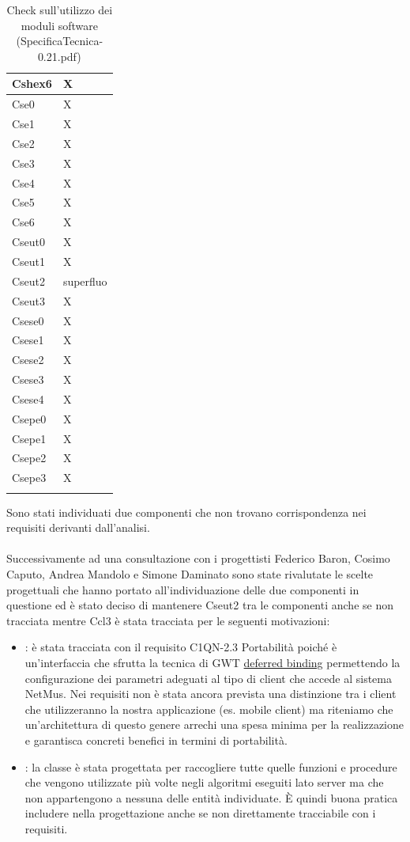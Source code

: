 \begin{footnotesize}
\begin{longtable}{|p{}|p{}|}
 Cshex6 &X  \\ \hline
 Cse0 &X  \\ \hline
 Cse1 &X  \\ \hline
 Cse2 &X  \\ \hline
 Cse3 &X  \\ \hline
 Cse4 &X  \\ \hline
 Cse5 &X  \\ \hline
 Cse6 &X  \\ \hline
 Cseut0 &X  \\ \hline
 Cseut1 &X  \\ \hline
 Cseut2 &superfluo  \\ \hline
 Cseut3 &X  \\ \hline
 Csese0 &X  \\ \hline
 Csese1 &X  \\ \hline
 Csese2 &X  \\ \hline
 Csese3 &X  \\ \hline
 Csese4 &X  \\ \hline
 Csepe0 &X  \\ \hline
 Csepe1 &X  \\ \hline
 Csepe2 &X  \\ \hline
 Csepe3 &X  \\ \hline

\caption{Check sull'utilizzo dei moduli software (SpecificaTecnica-0.21.pdf)}
\end{longtable}
\end{footnotesize}

Sono stati individuati due componenti che non trovano corrispondenza nei
requisiti derivanti dall'analisi. \\\\ 
Successivamente ad una consultazione con i progettisti Federico Baron, Cosimo
Caputo, Andrea Mandolo e Simone Daminato sono state rivalutate le scelte
progettuali che hanno portato all'individuazione delle due componenti in
questione ed \`e stato deciso di mantenere Cseut2 tra le componenti anche se non
tracciata mentre Ccl3 \`e stata tracciata per le seguenti motivazioni:
\begin{itemize}
  \item{: \`e stata tracciata con il requisito
  C1QN-2.3 Portabilit\`a poich\'e  \`e un'interfaccia che
  sfrutta la tecnica di GWT \underline{deferred binding} permettendo la
  configurazione dei parametri adeguati al tipo di client che accede al sistema
  NetMus. Nei requisiti non \`e stata ancora prevista una distinzione tra i
  client che utilizzeranno la nostra applicazione (es. mobile client) ma
  riteniamo che un'architettura di questo genere arrechi una spesa minima per la
  realizzazione e garantisca concreti benefici in termini di portabilit\`a.}
  \item{: la classe  \`e stata progettata per raccogliere
  tutte quelle funzioni e procedure che vengono utilizzate pi\`u volte negli
  algoritmi eseguiti lato server ma che non appartengono a nessuna delle entit\`a
  individuate. \`E quindi buona pratica includere  nella progettazione
  anche se non direttamente tracciabile con i requisiti.}
\end{itemize}


